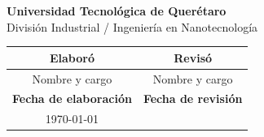 \documentclass[11pt, letterpaper]{article}
\begin{document}
	\vspace{1cm}
	
\begin{center}
	\textbf{Universidad Tecnológica de Querétaro}\\
	División Industrial / Ingeniería en Nanotecnología 
	

\begin{tabular}{|p{}|p{}|}
	\hline
	\multicolumn{1}{|c|}{\textbf{Elaboró}} & \multicolumn{1}{c|}{\textbf{Revisó}} \\[2cm]
	\hline
	\multicolumn{1}{|c|}{Nombre y cargo} & \multicolumn{1}{c|}{Nombre y cargo} \\
	\hline


	\multicolumn{1}{|c|}{\textbf{Fecha de elaboración}} & \multicolumn{1}{c|}{\textbf{Fecha de revisión}} \\[1cm]
	\hline
	\multicolumn{1}{|c|}{\today} & \multicolumn{1}{c|}{} \\
	\hline
\end{tabular}

\end{center}

	
\end{document}
